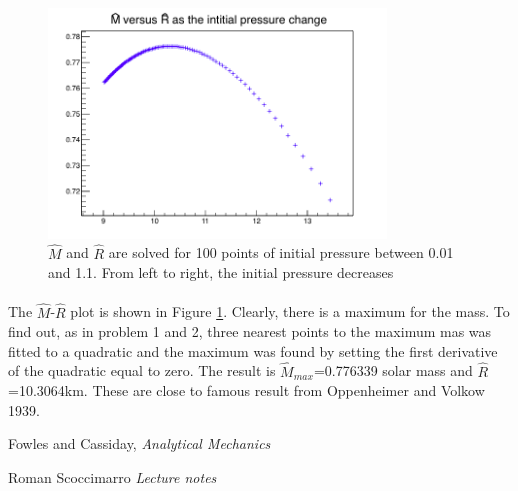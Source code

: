 \begin{figure}[!htpb]
\begin{center}
\includegraphics[width=0.8\textwidth]{3_d.png}
\caption{ $\hat{M}$ and $\hat{R } $ are solved for 100 points of initial pressure between 0.01 and 1.1. From left to right, the initial pressure decreases}
\label{3d}
\end{center}
\end{figure}
\FloatBarrier
\paragraph{}
The $\hat{M}$-$\hat{R}$ plot is shown in Figure \ref{3d}. Clearly, there is a maximum for the mass. To find out, as in problem 1 and 2, three nearest points to the maximum mas was fitted to a quadratic and the maximum was found by setting the first derivative of the quadratic equal to zero. The result is $\hat{M}_{max} $=0.776339 solar mass and $\hat{R}$=10.3064km. These are close to famous result from Oppenheimer and Volkow 1939.


\begin{thebibliography}{9}
  Fowles and Cassiday,
  \emph{Analytical Mechanics}

  Roman Scoccimarro
  \emph{Lecture notes}
  
\end{thebibliography}



